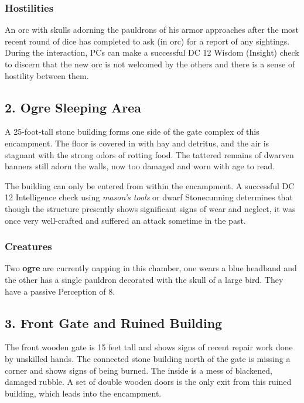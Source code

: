 \documentclass[10pt,a4paper,twoside,bg=print,twocolumn,openany,nodeprecatedcode]{dndbook}
\begin{document}
\subsubsection{Hostilities}
An orc with skulls adorning the pauldrons of his armor approaches after the most recent round of dice has completed to ask (in orc) for a report of any sightings. During the interaction, PCs can make a successful DC 12 Wisdom (Insight) check to discern that the new orc is not welcomed by the others and there is a sense of hostility between them.

\subsection{2. Ogre Sleeping Area}
\begin{DndReadAloud}{}
A 25-foot-tall stone building forms one side of the gate complex of this encampment. The floor is covered in with hay and detritus, and the air is stagnant with the strong odors of rotting food. The tattered remains of dwarven banners still adorn the walls, now too damaged and worn with age to read.

\end{DndReadAloud}

The building can only be entered from within the encampment. A successful DC 12 Intelligence check using \textit{mason's tools} or dwarf Stonecunning determines that though the structure presently shows significant signs of wear and neglect, it was once very well-crafted and suffered an attack sometime in the past.

\subsubsection{Creatures}
Two \textbf{ogre} are currently napping in this chamber, one wears a blue headband and the other has a single pauldron decorated with the skull of a large bird. They have a passive Perception of 8.

\subsection{3. Front Gate and Ruined Building}
\begin{DndReadAloud}{}
The front wooden gate is 15 feet tall and shows signs of recent repair work done by unskilled hands. The connected stone building north of the gate is missing a corner and shows signs of being burned. The inside is a mess of blackened, damaged rubble. A set of double wooden doors is the only exit from this ruined building, which leads into the encampment.

\end{DndReadAloud}
\end{document}
